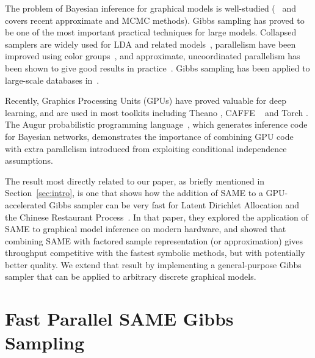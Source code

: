 \documentclass{article} %
\begin{document}
The problem of Bayesian inference for graphical models is  well-studied (~\citet{Koller2009}
and~\citet{Wainwright2008} covers recent approximate and MCMC methods). Gibbs sampling has proved to
be one of the most important practical techniques for large models. Collapsed samplers are widely
used for LDA and related models~\citep{Griffiths_Steyvers}, parallelism have been improved using
color groups~\citep{Gonzalez2011}, and approximate, uncoordinated parallelism has been shown to give
good results in practice~\citep{Johnson2013}.  Gibbs sampling has been applied to large-scale
databases in~\citep{Zhang2013}.

Recently, Graphics Processing Units (GPUs) have proved valuable for deep learning, and are used in
most toolkits including Theano \citep{Theano2012}, CAFFE ~\citep{jia2014caffe} and Torch
\citep{Torch}. The Augur probabilistic programming language~\citep{Augur2014}, which generates
inference code for Bayesian networks, demonstrates the importance of combining GPU code with extra
parallelism introduced from exploiting conditional independence assumptions.

The result most directly related to our paper, as briefly mentioned in Section~\ref{sec:intro}, is
one that shows how the addition of SAME to a GPU-accelerated Gibbs sampler can be very fast for
Latent Dirichlet Allocation and the Chinese Restaurant Process~\citep{SAME2015}. In that paper, they
explored the application of SAME to graphical model inference on modern hardware, and showed that
combining SAME with factored sample representation (or approximation) gives throughput competitive
with the fastest symbolic methods, but with potentially better quality. We extend that result by
implementing a general-purpose Gibbs sampler that can be applied to arbitrary discrete graphical
models.





\section{Fast Parallel SAME Gibbs Sampling}\label{sec:same}
\end{document}
